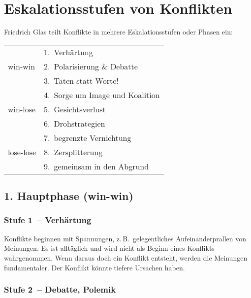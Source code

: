 \section{Eskalationsstufen von Konflikten}
\label{eskalationsstufen}

Friedrich Glas \cite{glasl-konfliktmanegement} teilt Konflikte in mehrere Eskalationsstufen oder Phasen ein:

\vspace{1em}

\begin{tabular}{ l l }
 \multirow{3}{5em}{win-win}   & 1.~Verhärtung \\
                              & 2.~Polarisierung \& Debatte \\
                              & 3.~Taten statt Worte! \\ \hline
 \multirow{3}{5em}{win-lose}  & 4.~Sorge um Image und Koalition \\
                              & 5.~Gesichtsverlust \\
                              & 6.~Drohstrategien \\ \hline
 \multirow{3}{5em}{lose-lose} & 7.~begrenzte Vernichtung \\
                              & 8.~Zersplitterung \\
                              & 9.~gemeinsam in den Abgrund \\
\end{tabular}


\subsection{1. Hauptphase (win-win)}

\subsubsection{Stufe 1~-- Verhärtung}

Konflikte beginnen mit Spannungen, z.\,B.~gelegentliches Aufeinanderprallen von Meinungen. Es ist alltäglich und wird nicht als Beginn eines Konflikts wahrgenommen. Wenn daraus doch ein Konflikt entsteht, werden die Meinungen fundamentaler. Der Konflikt könnte tiefere Ursachen haben.

\subsubsection{Stufe 2~-- Debatte, Polemik}

